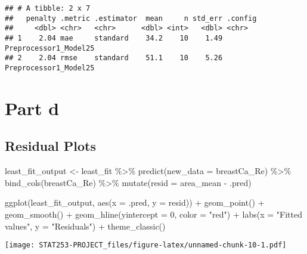 \documentclass[
]{article}
\newenvironment{Shaded}{\begin{snugshade}}{\end{snugshade}}
\newcommand{\AttributeTok}[1]{\textcolor[rgb]{0.77,0.63,0.00}{#1}}
\newcommand{\DecValTok}[1]{\textcolor[rgb]{0.00,0.00,0.81}{#1}}
\newcommand{\FunctionTok}[1]{\textcolor[rgb]{0.00,0.00,0.00}{#1}}
\newcommand{\NormalTok}[1]{#1}
\newcommand{\OtherTok}[1]{\textcolor[rgb]{0.56,0.35,0.01}{#1}}
\newcommand{\SpecialCharTok}[1]{\textcolor[rgb]{0.00,0.00,0.00}{#1}}
\newcommand{\StringTok}[1]{\textcolor[rgb]{0.31,0.60,0.02}{#1}}
\begin{document}
\begin{verbatim}
## # A tibble: 2 x 7
##   penalty .metric .estimator  mean     n std_err .config              
##     <dbl> <chr>   <chr>      <dbl> <int>   <dbl> <chr>                
## 1    2.04 mae     standard    34.2    10    1.49 Preprocessor1_Model25
## 2    2.04 rmse    standard    51.1    10    5.26 Preprocessor1_Model25
\end{verbatim}

\hypertarget{part-d}{%
\section{Part d}\label{part-d}}

\hypertarget{residual-plots}{%
\subsection{Residual Plots}\label{residual-plots}}

\begin{Shaded}
\begin{Highlighting}[]
\NormalTok{least\_fit\_output }\OtherTok{\textless{}{-}}\NormalTok{ least\_fit }\SpecialCharTok{\%\textgreater{}\%}
  \FunctionTok{predict}\NormalTok{(}\AttributeTok{new\_data =}\NormalTok{ breastCa\_Re) }\SpecialCharTok{\%\textgreater{}\%}
  \FunctionTok{bind\_cols}\NormalTok{(breastCa\_Re) }\SpecialCharTok{\%\textgreater{}\%}
  \FunctionTok{mutate}\NormalTok{(}\AttributeTok{resid =}\NormalTok{ area\_mean }\SpecialCharTok{{-}}\NormalTok{ .pred)}

\FunctionTok{ggplot}\NormalTok{(least\_fit\_output, }\FunctionTok{aes}\NormalTok{(}\AttributeTok{x =}\NormalTok{ .pred, }\AttributeTok{y =}\NormalTok{ resid)) }\SpecialCharTok{+}
  \FunctionTok{geom\_point}\NormalTok{() }\SpecialCharTok{+}
  \FunctionTok{geom\_smooth}\NormalTok{() }\SpecialCharTok{+}
  \FunctionTok{geom\_hline}\NormalTok{(}\AttributeTok{yintercept =} \DecValTok{0}\NormalTok{, }\AttributeTok{color =} \StringTok{"red"}\NormalTok{) }\SpecialCharTok{+}
  \FunctionTok{labs}\NormalTok{(}\AttributeTok{x =} \StringTok{"Fitted values"}\NormalTok{, }\AttributeTok{y =} \StringTok{"Residuals"}\NormalTok{) }\SpecialCharTok{+}
  \FunctionTok{theme\_classic}\NormalTok{()}
\end{Highlighting}
\end{Shaded}

\texttt{[image: STAT253-PROJECT\_files/figure-latex/unnamed-chunk-10-1.pdf]}
\end{document}
